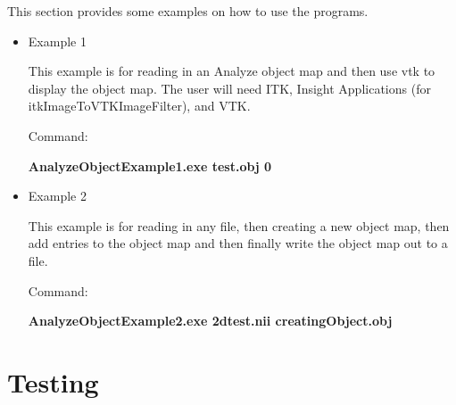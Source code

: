 \documentclass{InsightArticle}
\begin{document}
This section provides some examples on how to use the programs.
\begin{itemize}
\item Example 1 

This example is for reading in an Analyze object map and
then use vtk to display the object map.  The user will need ITK,
Insight Applications (for itkImageToVTKImageFilter), and VTK.

Command:

\textbf{AnalyzeObjectExample1.exe test.obj 0}  

\item Example 2

This example is for reading in any file, then creating a new object map,
then add entries to the object map and then finally write the object map out to a file.

Command:

\textbf{AnalyzeObjectExample2.exe 2dtest.nii creatingObject.obj}
\end{itemize}

\section{Testing}



%
%



\end{document}
